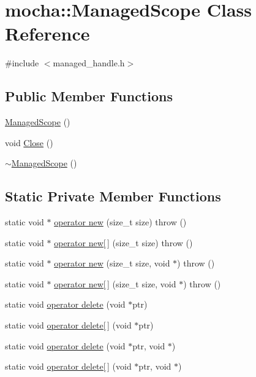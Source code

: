 \hypertarget{classmocha_1_1_managed_scope}{
\section{mocha::ManagedScope Class Reference}
\label{classmocha_1_1_managed_scope}
}


{\ttfamily \#include $<$managed\_\-handle.h$>$}

\subsection*{Public Member Functions}
\begin{DoxyCompactItemize}
\item 
\hyperlink{classmocha_1_1_managed_scope_a27ec1bef2a42eca9f4935b27deb2b855}{ManagedScope} ()
\item 
void \hyperlink{classmocha_1_1_managed_scope_a25adee78bcac2f3a36d4d87ada72c357}{Close} ()
\item 
\hyperlink{classmocha_1_1_managed_scope_a92d067cdab2d788992ac045d1a42c7d6}{$\sim$ManagedScope} ()
\end{DoxyCompactItemize}
\subsection*{Static Private Member Functions}
\begin{DoxyCompactItemize}
\item 
static void $\ast$ \hyperlink{classmocha_1_1_managed_scope_abbd433bc16ece0eed4f838cb884db794}{operator new} (size\_\-t size)  throw ()
\item 
static void $\ast$ \hyperlink{classmocha_1_1_managed_scope_ada6fa7911ca415a8dd2e8b0d3b5d85c0}{operator new\mbox{[}$\,$\mbox{]}} (size\_\-t size)  throw ()
\item 
static void $\ast$ \hyperlink{classmocha_1_1_managed_scope_a42716842f73c2352a8cc56e933d724ff}{operator new} (size\_\-t size, void $\ast$)  throw ()
\item 
static void $\ast$ \hyperlink{classmocha_1_1_managed_scope_af85b381f584ea8adb62512da25c55c8c}{operator new\mbox{[}$\,$\mbox{]}} (size\_\-t size, void $\ast$)  throw ()
\item 
static void \hyperlink{classmocha_1_1_managed_scope_a75acf85c21e6930b100ee5567ac586c0}{operator delete} (void $\ast$ptr)
\item 
static void \hyperlink{classmocha_1_1_managed_scope_aae845761f09d92001a4353bc951ed6a2}{operator delete\mbox{[}$\,$\mbox{]}} (void $\ast$ptr)
\item 
static void \hyperlink{classmocha_1_1_managed_scope_a3689ee4f2d7c15da3d1a489b37cf857e}{operator delete} (void $\ast$ptr, void $\ast$)
\item 
static void \hyperlink{classmocha_1_1_managed_scope_a4d443ad58e77a3250223e7593c4c1911}{operator delete\mbox{[}$\,$\mbox{]}} (void $\ast$ptr, void $\ast$)
\end{DoxyCompactItemize}
